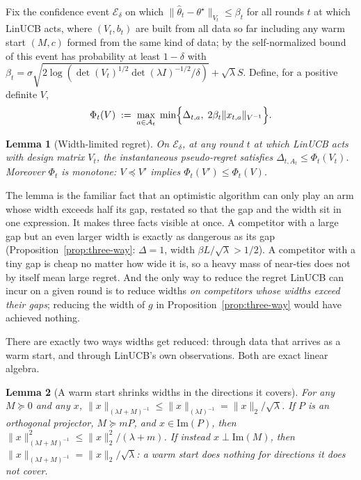 \documentclass{article}
\newtheorem{lemma}{Lemma}
\theoremstyle{definition}
\theoremstyle{remark}
\theoremstyle{remark}
\begin{document}
Fix the confidence event $\mathcal E_\delta$ on which
$\|\widehat\theta_t-\theta^\star\|_{V_t}\le\beta_t$ for all rounds $t$ at
which LinUCB acts, where $(V_t,b_t)$ are built from all data so far including
any warm start $(M,c)$ formed from the same kind of data; by the
self-normalized bound of \cite{abbasi2011improved} this event has probability
at least $1-\delta$ with
$\beta_t=\sigma\sqrt{2\log(\det(V_t)^{1/2}\det(\lambda I)^{-1/2}/\delta)}+\sqrt\lambda S$.
Define, for a positive definite $V$,
\begin{equation}
\label{eq:phi}
\Phi_t(V)\;:=\;\max_{a\in\mathcal A_t}\;\min\Bigl\{\Delta_{t,a},\;2\beta_t\|x_{t,a}\|_{V^{-1}}\Bigr\}.
\end{equation}

\begin{lemma}[Width-limited regret]
\label{lem:width-limited}
On $\mathcal E_\delta$, at any round $t$ at which LinUCB acts with design
matrix $V_t$, the instantaneous pseudo-regret satisfies
$\Delta_{t,A_t}\le\Phi_t(V_t)$. Moreover $\Phi_t$ is monotone: $V\preceq V'$
implies $\Phi_t(V')\le\Phi_t(V)$.
\end{lemma}

The lemma is the familiar fact that an optimistic algorithm can only play an
arm whose width exceeds half its gap, restated so that the gap and the width
sit in one expression. It makes three facts visible at once. A competitor with
a large gap but an even larger width is exactly as dangerous as its gap
(Proposition~\ref{prop:three-way}: $\Delta=1$, width $\beta L/\sqrt\lambda>1/2$).
A competitor with a tiny gap is cheap no matter how wide it is, so a heavy
mass of near-ties does not by itself mean large regret. And the only way to
reduce the regret LinUCB can incur on a given round is to reduce widths
\emph{on competitors whose widths exceed their gaps}; reducing the width of
$g$ in Proposition~\ref{prop:three-way} would have achieved nothing.

There are exactly two ways widths get reduced: through data that arrives as a
warm start, and through LinUCB's own observations. Both are exact linear
algebra.

\begin{lemma}[A warm start shrinks widths in the directions it covers]
\label{lem:loewner}
For any $M\succeq0$ and any $x$, $\|x\|_{(\lambda I+M)^{-1}}\le\|x\|_{(\lambda I)^{-1}}=\|x\|_2/\sqrt\lambda$.
If $P$ is an orthogonal projector, $M\succeq mP$, and $x\in\mathrm{Im}(P)$, then
$\|x\|^2_{(\lambda I+M)^{-1}}\le\|x\|_2^2/(\lambda+m)$. If instead $x\perp\mathrm{Im}(M)$,
then $\|x\|_{(\lambda I+M)^{-1}}=\|x\|_2/\sqrt\lambda$: a warm start does nothing
for directions it does not cover.
\end{lemma}
\end{document}
